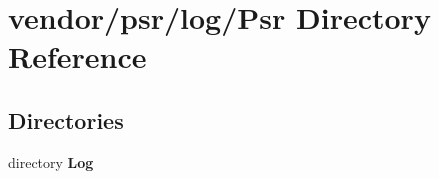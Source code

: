 \section{vendor/psr/log/\+Psr Directory Reference}
\label{dir_64707f3f35abceb2076e4352898f128c}
\subsection*{Directories}
\begin{DoxyCompactItemize}
\item 
directory {\bf Log}
\end{DoxyCompactItemize}
